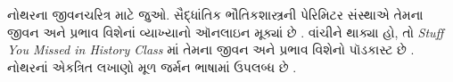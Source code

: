 \documentclass[../../../include/open-logic-section]{subfiles}
\begin{document}
\begin{reading} 
નોથરના જીવનચરિત્ર માટે
\citet{Dick1981} જુઓ. સૈદ્ધાંતિક
ભૌતિકશાસ્ત્રની પેરિમિટર
સંસ્થાએ તેમના જીવન અને
પ્રભાવ વિશેનાં વ્યાખ્યાનો
ઑનલાઇન મૂક્યાં છે
\citep{Perimeter2015}. વાંચીને
થાક્યા હો, તો
\emph{Stuff You Missed in History Class}
માં તેમના જીવન અને પ્રભાવ
વિશેનો પૉડકાસ્ટ છે
\citep{Frey2015}. નોથરનાં
એકત્રિત લખાણો મૂળ જર્મન
ભાષામાં ઉપલબ્ધ છે
\citep{Noether1983}.
\end{reading}
\end{document}

